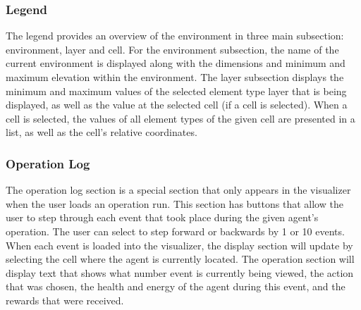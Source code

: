 \subsubsection{Legend}
The legend provides an overview of the environment in three main subsection: environment, layer and cell.
For the environment subsection, the name of the current environment is displayed along with the dimensions and minimum and maximum elevation within the environment.
The layer subsection displays the minimum and maximum values of the selected element type layer that is being displayed, as well as the value at the selected cell (if a cell is selected).
When a cell is selected, the values of all element types of the given cell are presented in a list, as well as the cell's relative coordinates.


\subsubsection{Operation Log}
The operation log section is a special section that only appears in the visualizer when the user loads an operation run.
This section has buttons that allow the user to step through each event that took place during the given agent's operation.
The user can select to step forward or backwards by 1 or 10 events.
When each event is loaded into the visualizer, the display section will update by selecting the cell where the agent is currently located.
The operation section will display text that shows what number event is currently being viewed, the action that was chosen, the health and energy of the agent during this event, and the rewards that were received.
